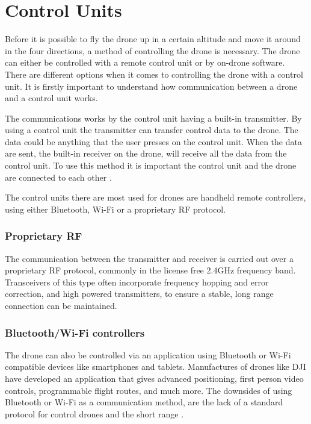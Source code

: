 \section{Control Units}\label{s:cont}
Before it is possible to fly the drone up in a certain altitude and move it around in the four directions, a method of controlling the drone is necessary. The drone can either be controlled with a remote control unit or by on-drone software. %
\newline
There are different options when it comes to controlling the drone with a control unit. It is firstly important to understand how communication between a drone and a control unit works. %

The communications works by the control unit having a built-in transmitter. By using a control unit the transmitter can transfer control data to the drone. The data could be anything that the user presses on the control unit. When the data are sent, the built-in receiver on the drone, will receive all the data from the control unit. To use this method it is important the control unit and the drone are connected to each other \cite{Control}.



The control units there are most used for drones are handheld remote controllers, using either Bluetooth, Wi-Fi or a proprietary RF protocol.

\subsubsection*{Proprietary RF}
The communication between the transmitter and receiver is carried out over a proprietary RF protocol, commonly in the license free 2.4GHz frequency band. Transceivers of this type often incorporate frequency hopping and error correction, and high powered transmitters, to ensure a stable, long range connection can be maintained. 

\subsubsection*{Bluetooth/Wi-Fi controllers}
The drone can also be controlled via an application using Bluetooth or Wi-Fi compatible devices like smartphones and tablets. Manufactures of drones like DJI have developed an application that gives advanced positioning, first person video controls, programmable flight routes, and much more. The downsides of using Bluetooth or Wi-Fi as a communication method, are the lack of a standard protocol for control drones and the short range \cite{droneRange}. 

